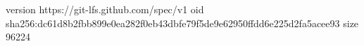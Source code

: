 version https://git-lfs.github.com/spec/v1
oid sha256:dc61d8b2fbb899e0ea282f0eb43dbfe79f5de9e62950ffdd6e225d2fa5acee93
size 96224
